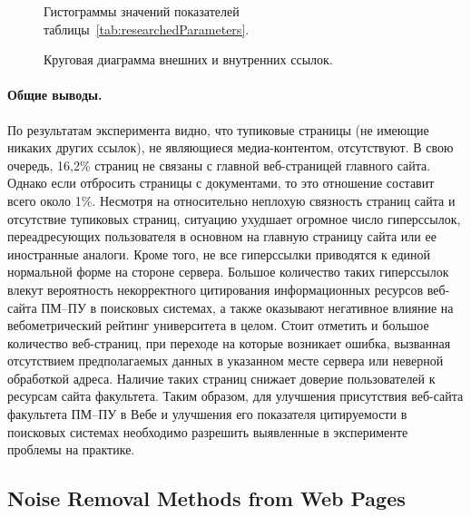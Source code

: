 \begin{figure}[ht]
	\caption{Гистограммы значений показателей таблицы~\cref{tab:researchedParameters}.}\label{fig:histogramOfTab1}
\end{figure}

\begin{figure}[ht]
	\caption{Круговая диаграмма внешних и внутренних ссылок.}\label{fig:linkDiagram}
\end{figure}

\paragraph{Общие выводы.} По результатам эксперимента видно, что тупиковые страницы (не имеющие никаких других ссылок), не являющиеся медиа-контентом, отсутствуют. В свою очередь, 16,2\% страниц не связаны с главной веб-страницей главного сайта. Однако если отбросить страницы с документами, то это отношение составит всего около 1\%.
Несмотря на относительно неплохую связность страниц сайта и отсутствие тупиковых страниц, ситуацию ухудшает огромное число гиперссылок, переадресующих пользователя в основном на главную страницу сайта или ее иностранные аналоги. Кроме того, не все гиперссылки приводятся к единой нормальной форме на стороне сервера. Большое количество таких гиперссылок влекут вероятность некорректного цитирования информационных ресурсов веб-сайта ПМ–ПУ в поисковых системах, а также оказывают негативное влияние на вебометрический рейтинг университета в целом.
Стоит отметить и большое количество веб-страниц, при переходе на которые возникает ошибка, вызванная отсутствием предполагаемых данных в указанном месте сервера или неверной обработкой адреса. Наличие таких страниц снижает доверие пользователей к ресурсам сайта факультета.
Таким образом, для улучшения присутствия веб-сайта факультета ПМ–ПУ в Вебе и улучшения его показателя цитируемости в поисковых системах необходимо разрешить выявленные в эксперименте проблемы на практике.

\subsection{Noise Removal Methods from Web Pages}\label{subsec:ch1/sec3/sub4}

